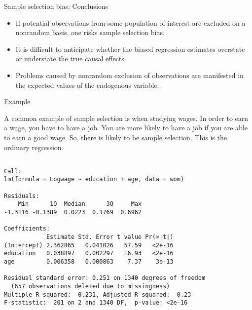 \documentclass[10pt,ignorenonframetext,]{beamer}
\providecommand{\tightlist}{%
  \setlength{\itemsep}{0pt}\setlength{\parskip}{0pt}}
\begin{document}
\begin{frame}{Sample selection bias: Conclusions}

\begin{itemize}
\tightlist
\item
  If potential observations from some population of interest are
  excluded on a nonrandom basis, one risks sample selection bias.
\item
  It is difficult to anticipate whether the biased regression estimates
  overstate or understate the true causal effects.
\item
  Problems caused by nonrandom exclusion of observations are manifested
  in the expected values of the endogenous variable.
\end{itemize}

\end{frame}

\begin{frame}[fragile]{Example}

\scriptsize
A common example of sample selection is when studying wages. In order to
earn a wage, you have to have a job. You are more likely to have a job
if you are able to earn a good wage. So, there is likely to be sample
selection. This is the ordinary regression.

\begin{verbatim}

Call:
lm(formula = Logwage ~ education + age, data = wom)

Residuals:
    Min      1Q  Median      3Q     Max 
-1.3116 -0.1389  0.0223  0.1769  0.6962 

Coefficients:
            Estimate Std. Error t value Pr(>|t|)
(Intercept) 2.362865   0.041026   57.59   <2e-16
education   0.038897   0.002297   16.93   <2e-16
age         0.006358   0.000863    7.37    3e-13

Residual standard error: 0.251 on 1340 degrees of freedom
  (657 observations deleted due to missingness)
Multiple R-squared:  0.231, Adjusted R-squared:  0.23 
F-statistic:  201 on 2 and 1340 DF,  p-value: <2e-16
\end{verbatim}

\end{frame}
\end{document}
